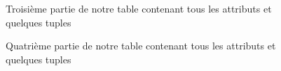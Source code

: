 \documentclass[a4paper,sffamily,12pt]{article}
\begin{document}
				\begin{figure}[!h]
					\centering						
					\caption{Troisième partie de notre table contenant tous les attributs et quelques tuples}
					\label{table_p3}	
				\end{figure}	

				\begin{figure}[!h]
					\centering						
					\caption{Quatrième partie de notre table contenant tous les attributs et quelques tuples}
					\label{table_p4}	
				\end{figure}
				
\end{document}
